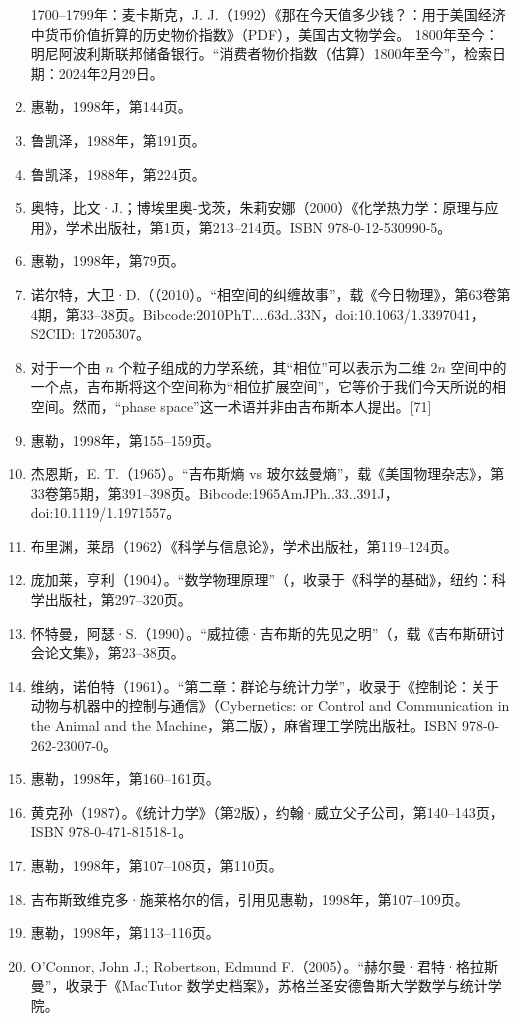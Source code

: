 \begin{enumerate}
1700–1799年：麦卡斯克，J. J.（1992）《那在今天值多少钱？：用于美国经济中货币价值折算的历史物价指数》（PDF），美国古文物学会。
1800年至今：明尼阿波利斯联邦储备银行。“消费者物价指数（估算）1800年至今”，检索日期：2024年2月29日。
\item 惠勒，1998年，第144页。
\item 鲁凯泽，1988年，第191页。
\item 鲁凯泽，1988年，第224页。
\item 奥特，比文·J.；博埃里奥-戈茨，朱莉安娜（2000）《化学热力学：原理与应用》，学术出版社，第1页，第213–214页。ISBN 978-0-12-530990-5。
\item 惠勒，1998年，第79页。
\item 诺尔特，大卫·D.（（2010）。“相空间的纠缠故事”，载《今日物理》，第63卷第4期，第33–38页。Bibcode:2010PhT....63d..33N，doi:10.1063/1.3397041，S2CID: 17205307。
\item 对于一个由 $n$ 个粒子组成的力学系统，其“相位”可以表示为二维 $2n$ 空间中的一个点，吉布斯将这个空间称为“相位扩展空间”，它等价于我们今天所说的相空间。然而，“phase space”这一术语并非由吉布斯本人提出。[71]
\item 惠勒，1998年，第155–159页。
\item 杰恩斯，E. T.（1965）。“吉布斯熵 vs 玻尔兹曼熵”，载《美国物理杂志》，第33卷第5期，第391–398页。Bibcode:1965AmJPh..33..391J，doi:10.1119/1.1971557。
\item 布里渊，莱昂（1962）《科学与信息论》，学术出版社，第119–124页。
\item 庞加莱，亨利（1904）。“数学物理原理”（，收录于《科学的基础》，纽约：科学出版社，第297–320页。
\item 怀特曼，阿瑟·S.（1990）。“威拉德·吉布斯的先见之明”（，载《吉布斯研讨会论文集》，第23–38页。
\item 维纳，诺伯特（1961）。“第二章：群论与统计力学”，收录于《控制论：关于动物与机器中的控制与通信》（Cybernetics: or Control and Communication in the Animal and the Machine，第二版），麻省理工学院出版社。ISBN 978-0-262-23007-0。
\item 惠勒，1998年，第160–161页。
\item 黄克孙（1987）。《统计力学》（第2版），约翰·威立父子公司，第140–143页，ISBN 978-0-471-81518-1。
\item 惠勒，1998年，第107–108页，第110页。
\item 吉布斯致维克多·施莱格尔的信，引用见惠勒，1998年，第107–109页。
\item 惠勒，1998年，第113–116页。
\item O'Connor, John J.; Robertson, Edmund F.（2005）。“赫尔曼·君特·格拉斯曼”，收录于《MacTutor 数学史档案》，苏格兰圣安德鲁斯大学数学与统计学院。

\end{enumerate}
